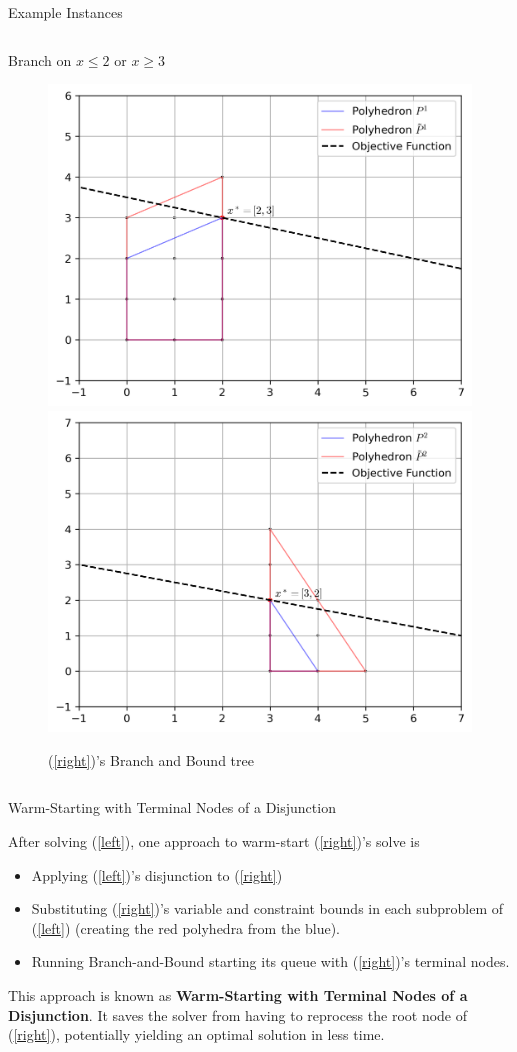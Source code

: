 \documentclass[final]{beamer}
\newlength{\colwidth}
\begin{document}
\begin{frame}[t]
\begin{columns}[t]
\begin{column}{\colwidth}
\begin{block}{Example Instances}
\begin{columns}[T]
\begin{column}{0.45\textwidth}
\begin{figure}[h]
    			\label{p:root_prime}
    		\end{figure}
    		\centering
    		Branch on $ x \leq 2 $ or $ x \geq 3 $
    		\begin{figure}[]
    			\centering
    			\includegraphics[width=.45\textwidth]{P1_prime.png}
    			\hfill
    			\includegraphics[width=.45\textwidth]{P2_prime.png}
    			\caption{(\ref{right})'s Branch and Bound tree}
    			\label{p:after}
    		\end{figure}
    	\end{column}
    \end{columns}
  \end{block}

  \begin{block}{Warm-Starting with Terminal Nodes of a Disjunction}

    After solving (\ref{left}), one approach to warm-start (\ref{right})'s solve is
    \begin{itemize}
    	\item Applying (\ref{left})'s disjunction to (\ref{right})
    	\item Substituting (\ref{right})'s variable and constraint bounds in each subproblem of (\ref{left}) (creating the red polyhedra from the blue).
    	\item Running Branch-and-Bound starting its queue with (\ref{right})'s terminal nodes.
    \end{itemize}
	This approach is known as \textbf{Warm-Starting with Terminal Nodes of a Disjunction}. It saves the solver from having to reprocess the root node of (\ref{right}), potentially yielding an optimal solution in less time.


\end{block}
\end{column}
\end{columns}
\end{frame}
\end{document}
